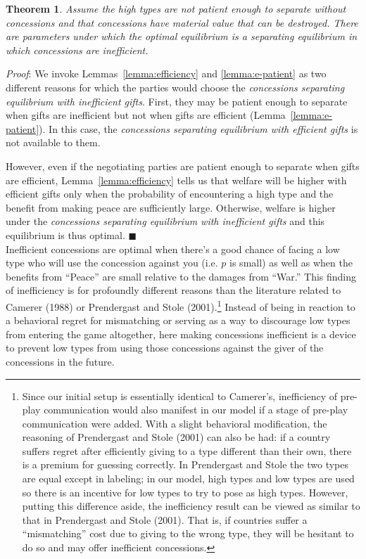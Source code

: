 \documentclass[12pt, letterpaper]{article}
\newtheorem{theorem}{Theorem}
\begin{document}
\begin{theorem}
		Assume the high types are not patient enough to separate without concessions and that concessions have material value that can be destroyed. There are parameters under which the optimal equilibrium is a separating equilibrium in which concessions are inefficient.
	\label{theorem:4}
\end{theorem}
\emph{Proof}: We invoke Lemmas~\ref{lemma:efficiency} and \ref{lemma:e-patient} as two different reasons for which the parties would choose the \emph{concessions separating equilibrium with inefficient gifts}. First, they may be patient enough to separate when gifts are inefficient but not when gifts are efficient (Lemma~\ref{lemma:e-patient}). In this case, the \emph{concessions separating equilibrium with efficient gifts} is not available to them.

However, even if the negotiating parties are patient enough to separate when gifts are efficient, Lemma~\ref{lemma:efficiency} tells us that welfare will be higher with efficient gifts only when the probability of encountering a high type and the benefit from making peace are sufficiently large. Otherwise, welfare is higher under the \emph{concessions separating equilibrium with inefficient gifts} and this equilibrium is thus optimal. \hfill $\blacksquare$\\

Inefficient concessions are optimal when there's a good chance of facing a low type who will use the concession against you (i.e. $p$ is small) as well as when the benefits from ``Peace'' are small relative to the damages from ``War.'' This finding of inefficiency is for profoundly different reasons than the literature related to Camerer (1988) or Prendergast and Stole (2001).\footnote{Since our initial setup is essentially identical to Camerer's, inefficiency of  pre-play communication would also manifest in our model if a stage of pre-play communication were added. With a slight behavioral modification, the reasoning of Prendergast and Stole (2001) can also be had: if a country suffers regret after efficiently giving to a type different than their own, there is a premium for guessing correctly. In Prendergast and Stole the two types are equal except in labeling; in our model, high types and low types are used so there is an incentive for low types to try to pose as high types. However, putting this difference aside, the inefficiency result can be viewed as similar to that in Prendergast and Stole (2001). That is, if countries suffer a ``mismatching'' cost due to giving to the wrong type, they will be hesitant to do so and may offer inefficient concessions.} Instead of being in reaction to a behavioral regret for mismatching or serving as a way to discourage low types from entering the game altogether, here making concessions inefficient is a device to prevent low types from using those concessions against the giver of the concessions in the future.
\end{document}
